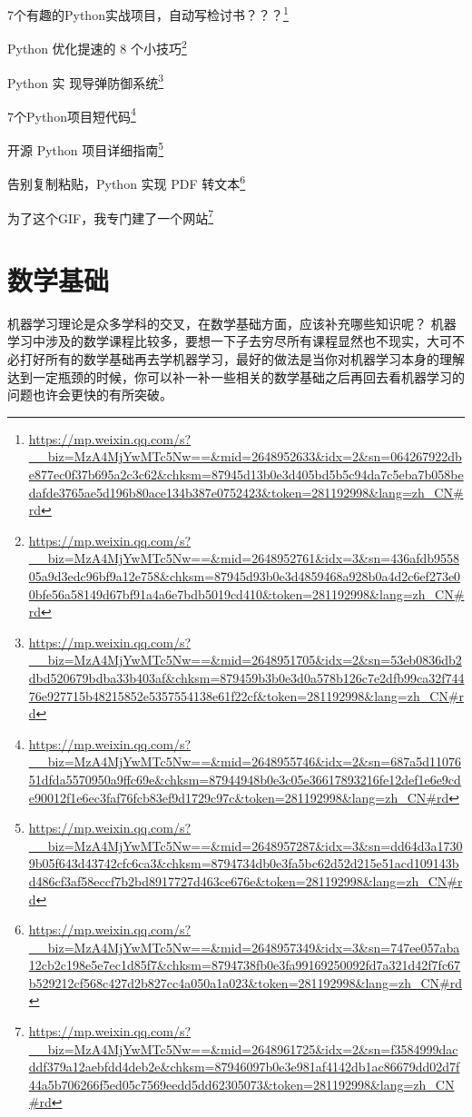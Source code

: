 \documentclass[]{ctexbook}
\renewcommand{\href}[2]{#2\footnote{\url{#1}}}
\begin{document}
\href{https://mp.weixin.qq.com/s?__biz=MzA4MjYwMTc5Nw==\&mid=2648952633\&idx=2\&sn=064267922dbe877ec0f37b695a2c3c62\&chksm=87945d13b0e3d405bd5b5c94da7c5eba7b058bedafde3765ae5d196b80ace134b387e0752423\&token=281192998\&lang=zh_CN\#rd}{7个有趣的Python实战项目，自动写检讨书？？？}

\href{https://mp.weixin.qq.com/s?__biz=MzA4MjYwMTc5Nw==\&mid=2648952761\&idx=3\&sn=436afdb955805a9d3edc96bf9a12e758\&chksm=87945d93b0e3d4859468a928b0a4d2c6ef273e00bfe56a58149d67bf91a4a6e7bdb5019cd410\&token=281192998\&lang=zh_CN\#rd}{Python 优化提速的 8 个小技巧}

\href{https://mp.weixin.qq.com/s?__biz=MzA4MjYwMTc5Nw==\&mid=2648951705\&idx=2\&sn=53eb0836db2dbd520679bdba33b403af\&chksm=879459b3b0e3d0a578b126c7e2dfb99ca32f74476e927715b48215852e5357554138e61f22cf\&token=281192998\&lang=zh_CN\#rd}{Python 实 现导弹防御系统}

\href{https://mp.weixin.qq.com/s?__biz=MzA4MjYwMTc5Nw==\&mid=2648955746\&idx=2\&sn=687a5d1107651dfda5570950a9ffc69e\&chksm=87944948b0e3c05e36617893216fe12def1e6e9cde90012f1e6ec3faf76fcb83ef9d1729c97c\&token=281192998\&lang=zh_CN\#rd}{7个Python项目短代码}

\href{https://mp.weixin.qq.com/s?__biz=MzA4MjYwMTc5Nw==\&mid=2648957287\&idx=3\&sn=dd64d3a17309b05f643d43742cfc6ca3\&chksm=8794734db0e3fa5bc62d52d215e51acd109143bd486cf3af58eccf7b2bd8917727d463ce676e\&token=281192998\&lang=zh_CN\#rd}{开源 Python 项目详细指南}

\href{https://mp.weixin.qq.com/s?__biz=MzA4MjYwMTc5Nw==\&mid=2648957349\&idx=3\&sn=747ee057aba12cb2c198e5e7ec1d85f7\&chksm=8794738fb0e3fa99169250092fd7a321d42f7fc67b529212cf568c427d2b827cc4a050a1a023\&token=281192998\&lang=zh_CN\#rd}{告别复制粘贴，Python 实现 PDF 转文本}

\href{https://mp.weixin.qq.com/s?__biz=MzA4MjYwMTc5Nw==\&mid=2648961725\&idx=2\&sn=f3584999dacddf379a12aebfdd4deb2e\&chksm=87946097b0e3e981af4142db1ac86679dd02d7f44a5b706266f5ed05c7569eedd5dd62305073\&token=281192998\&lang=zh_CN\#rd}{为了这个GIF，我专门建了一个网站}

\hypertarget{ux6570ux5b66ux57faux7840}{%
\chapter{数学基础}\label{ux6570ux5b66ux57faux7840}}

机器学习理论是众多学科的交叉，在数学基础方面，应该补充哪些知识呢？
机器学习中涉及的数学课程比较多，要想一下子去穷尽所有课程显然也不现实，大可不必打好所有的数学基础再去学机器学习，最好的做法是当你对机器学习本身的理解达到一定瓶颈的时候，你可以补一补一些相关的数学基础之后再回去看机器学习的问题也许会更快的有所突破。
\end{document}
